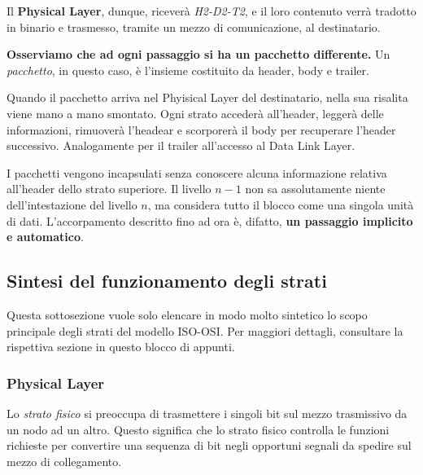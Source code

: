         \vspace{3mm}
        
        Il \textbf{Physical Layer}, dunque, riceverà \textit{
        H2-D2-T2}, e il loro contenuto verrà tradotto in binario e trasmesso, tramite un mezzo di comunicazione, al destinatario.
        
        \vspace{3mm}
        
        \textbf{Osserviamo che ad ogni passaggio si ha un pacchetto differente.} Un \textit{pacchetto}, in questo caso, è l'insieme costituito da header, body e trailer.
        
        \vspace{3mm}
        
        Quando il pacchetto arriva nel Phyisical Layer del destinatario, nella sua risalita viene mano a mano smontato. Ogni strato accederà all'header, leggerà delle informazioni, rimuoverà l'headear e scorporerà il body per recuperare l'header successivo. Analogamente per il trailer all'accesso al Data Link Layer.
        
        \vspace{3mm}
        
        I pacchetti vengono incapsulati senza conoscere alcuna informazione relativa all'header dello strato superiore. Il livello \(n-1\) non sa assolutamente niente dell'intestazione del livello \(n\), ma considera tutto il blocco come una singola unità di dati. L'accorpamento descritto fino ad ora è, difatto, \textbf{un passaggio implicito e automatico}.
    
    \subsection{Sintesi del funzionamento degli strati}
    
        Questa sottosezione vuole solo elencare in modo molto sintetico lo scopo principale degli strati del modello ISO-OSI. Per maggiori dettagli, consultare la rispettiva sezione in questo blocco di appunti.
    
        \subsubsection{Physical Layer}
        
        Lo \textit{strato fisico} si preoccupa di trasmettere i singoli bit sul mezzo trasmissivo da un nodo ad un altro. Questo significa che lo strato fisico controlla le funzioni richieste per convertire una sequenza di bit negli opportuni segnali da spedire sul mezzo di collegamento. 
        
